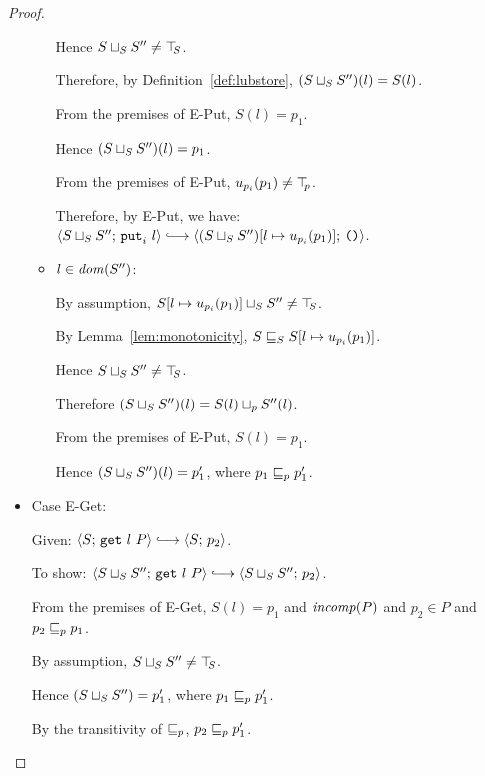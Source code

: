 \begin{proof}
\begin{itemize}
\begin{itemize}
          Hence $S \sqcup_{S} S'' \neq \top\hspace{-0.85mm}_{S}$.

          Therefore, by Definition~\ref{def:lubstore},
          $(S \sqcup_{S} S'')(l) = S(l)$.

          From the premises of {\sc E-Put}, $S(l) = p_1$.

          Hence $(S \sqcup_{S} S'')(l) = p_1$.

          From the premises of {\sc E-Put}, $u_{p_i}(p_1) \neq \top\hspace{-0.85mm}_{p}$.

          Therefore, by {\sc E-Put}, we have:
          $\config{\lubstore{S}{S''}}{\putiexp{l}} \parstepsto
          \config{\extSRaw{(\lubstore{S}{S''})}{l}{u_{p_i}(p_1)}}{\unit}$.

        \item $l \in \mathit{dom}(S'')$:

          By assumption, $S[l \mapsto u_{p_i}(p_1)] \sqcup_{S} S'' \neq
          \top\hspace{-0.85mm}_{S}$.

          By Lemma~\ref{lem:monotonicity},
          $S \sqsubseteq_S S[l \mapsto u_{p_i}(p_1)]$.

          Hence $S \sqcup_{S} S'' \neq \top\hspace{-0.85mm}_{S}$.

          Therefore $(S \sqcup_{S} S'')(l) = S(l) \sqcup_p S''(l)$.

          From the premises of {\sc E-Put}, $S(l) = p_1$.

          Hence $(S \sqcup_{S} S'')(l) = p'_1$, where $p_1 \sqsubseteq_p
          p'_1$.


      \end{itemize}

    \item Case {\sc E-Get}:

      Given: $\config{S}{\getexp{l}{P}} \parstepsto \config{S}{p_2}$.

      To show: $\config{\lubstore{S}{S''}}{\getexp{l}{P}} \parstepsto
      \config{\lubstore{S}{S''}}{p_2}$.

      From the premises of {\sc E-Get}, $S(l) = p_1$ and $\mathit{incomp}(P)$
      and $p_2 \in P$ and $p_2 \sqsubseteq_p p_1$.

      By assumption, $S \sqcup_{S} S'' \neq \top\hspace{-0.85mm}_{S}$.

      Hence $(S \sqcup_{S} S'') = p'_1$, where $p_1 \sqsubseteq_p p'_1$.

      By the transitivity of $\sqsubseteq_p$, $p_2 \sqsubseteq_p p'_1$.


\end{itemize}
\end{proof}
